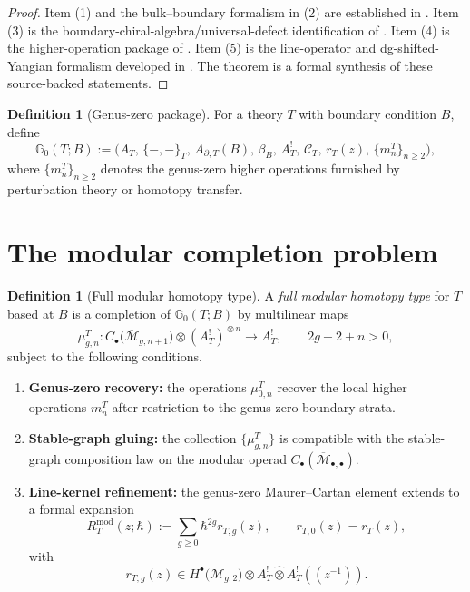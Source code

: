 \documentclass[11pt]{article}
\theoremstyle{definition}
\newtheorem{definition}[theorem]{Definition}
\theoremstyle{remark}
\newcommand{\C}{\mathcal C}
\newcommand{\G}{\mathbb G}
\newcommand{\M}{\mathcal M}
\newcommand{\modu}{\mathrm{mod}}
\begin{document}
\begin{proof}
Item \textup{(1)} and the bulk--boundary formalism in \textup{(2)} are established in \cite{CDG2023}. Item \textup{(3)} is the boundary-chiral-algebra/universal-defect identification of \cite{Zeng2024}. Item \textup{(4)} is the higher-operation package of \cite{GKW2025}. Item \textup{(5)} is the line-operator and dg-shifted-Yangian formalism developed in \cite{DNP2025}. The theorem is a formal synthesis of these source-backed statements.
\end{proof}

\begin{definition}[Genus-zero package]\label{def:genus-zero-package}
For a theory $T$ with boundary condition $B$, define
\[
\G_0(T;B)
:=
\bigl(A_T,\,\{-,-\}_T,\,A_{\partial,T}(B),\,\beta_B,\,A_T^!,\,\C_T,\,r_T(z),\,\{m_n^T\}_{n\ge 2}\bigr),
\]
where $\{m_n^T\}_{n\ge 2}$ denotes the genus-zero higher operations furnished by perturbation theory or homotopy transfer.
\end{definition}

\section{The modular completion problem}

\begin{definition}[Full modular homotopy type]\label{def:full-modular-homotopy-type}
A \emph{full modular homotopy type} for $T$ based at $B$ is a completion of $\G_0(T;B)$ by multilinear maps
\[
\mu^T_{g,n}:
C_\bullet\bigl(\overline{\M}_{g,n+1}\bigr)
\otimes
(A_T^!)^{\widehat\otimes n}
\longrightarrow
A_T^!,
\qquad 2g-2+n>0,
\]
subject to the following conditions.
\begin{enumerate}[label=\textup{(\alph*)}]
  \item \textbf{Genus-zero recovery:} the operations $\mu_{0,n}^T$ recover the local higher operations $m_n^T$ after restriction to the genus-zero boundary strata.
  \item \textbf{Stable-graph gluing:} the collection $\{\mu^T_{g,n}\}$ is compatible with the stable-graph composition law on the modular operad $C_\bullet(\overline{\M}_{\bullet,\bullet})$.
  \item \textbf{Line-kernel refinement:} the genus-zero Maurer--Cartan element extends to a formal expansion
  \[
  R_T^{\modu}(z;\hbar)
  :=
  \sum_{g\ge 0}\hbar^{2g}r_{T,g}(z),
  \qquad
  r_{T,0}(z)=r_T(z),
  \]
  with
  \[
  r_{T,g}(z)\in H^\bullet\bigl(\overline{\M}_{g,2}\bigr)\otimes A_T^!\widehat\otimes A_T^!((z^{-1})).
  \]
\end{enumerate}
\end{definition}
\end{document}
